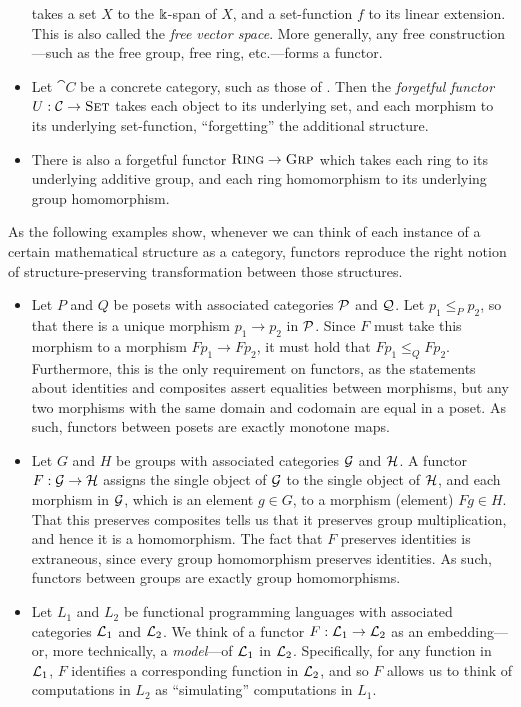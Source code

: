 \begin{ex}
\begin{itemize}
      takes a set $X$ to the $\Bbbk$-span of $X$, and a set-function $f$ to
      its linear extension. This is also called the \emph{free vector space}.
      More generally, any free construction---such as the free group, free ring,
      etc.---forms a functor.
    \item Let $\cat{C}$ be a concrete category, such as those of .
      Then the \emph{forgetful functor} $U: {\mathcal{C}}\to{\textsc{\text{Set}}}$ takes each object to
      its underlying set, and each morphism to its underlying set-function,
      ``forgetting'' the additional structure.
    \item There is also a forgetful functor ${\textsc{\text{Ring}}}\to{\textsc{\text{Grp}}}$ which
      takes each ring to its underlying additive group, and each ring
      homomorphism to its underlying group homomorphism.
  \end{itemize}
\end{ex}

\begin{ex}\label{ex:abstract-functors}
  As the following examples show, whenever we can think of each instance of a
  certain mathematical structure as a category, functors reproduce the right
  notion of structure-preserving transformation between those structures.
  \begin{itemize}
    \item Let $P$ and $Q$ be posets with associated categories $\mathcal{P}$ and $\mathcal{Q}$. Let
      $p_1\leq_P p_2$, so that there is a unique morphism $p_1\to p_2$ in $\mathcal{P}$. Since
      $F$ must take this morphism to a morphism $Fp_1\to Fp_2$, it must hold that
      $Fp_1\leq_Q Fp_2$. Furthermore, this is the only requirement on functors, as
      the statements about identities and composites assert equalities between
      morphisms, but any two morphisms with the same domain and codomain are equal
      in a poset. As such, functors between posets are exactly monotone maps.
    \item Let $G$ and $H$ be groups with associated categories $\mathcal{G}$ and
      $\mathcal{H}$. A functor $F: \mathcal{G}\to\mathcal{H}$ assigns the single object of $\mathcal{G}$ to the
      single object of $\mathcal{H}$, and each morphism in $\mathcal{G}$, which is an element $g\in
      G$, to a morphism (element) $Fg\in H$. That this preserves composites tells us
      that it preserves group multiplication, and hence it is a homomorphism. The
      fact that $F$ preserves identities is extraneous, since every group
      homomorphism preserves identities. As such, functors between groups are exactly
      group homomorphisms.
    \item Let $L_1$ and $L_2$ be functional programming languages with associated
      categories $\mathcal{L}_1$ and $\mathcal{L}_2$. We think of a functor $F: \mathcal{L}_1\to\mathcal{L}_2$ as an
      embedding---or, more technically, a \emph{model}---of $\mathcal{L}_1$ in $\mathcal{L}_2$.
      Specifically, for any function in $\mathcal{L}_1$, $F$ identifies a corresponding
      function in $\mathcal{L}_2$, and so $F$ allows us to think of computations in $L_2$ as
      ``simulating'' computations in $L_1$.
  \end{itemize}
\end{ex}

